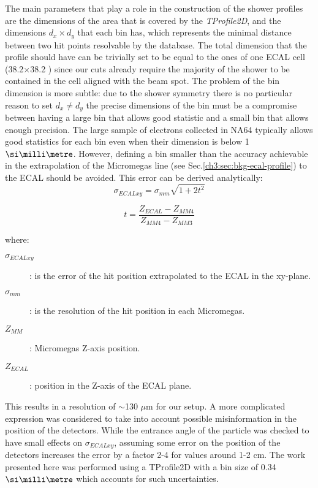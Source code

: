The main parameters that play a role in the construction of the shower
profiles are the dimensions of the area that is covered by the
\textit{TProfile2D}, and the dimensions $d_x \times d_y$ that each bin has,
which represents the minimal distance between two hit points resolvable by the database.  The total dimension that the profile
should have can be trivially set to be equal to the ones of one ECAL
cell (38.2$\times$38.2 \mms) since our cuts already require the majority of the shower to be contained in the cell aligned with the beam spot. The problem of the bin dimension is
more subtle: due to the shower symmetry there is no particular reason
to set $d_x \neq d_y$ the precise dimensions of the bin must be a
compromise between having a large bin that allows good statistic and a
small bin that allows enough precision. The large sample of electrons
collected in NA64 typically allows good statistics for each bin even
when their dimension is below 1 $\mmi$. However, defining a bin smaller
than the accuracy achievable in the extrapolation of the Micromegas line (see Sec.\ref{ch3:sec:bkg-ecal-profile}) to the ECAL should be avoided. This error can be
derived analytically:
\begin{equation}
  \sigma_{ECALxy} = \sigma_{mm}\sqrt{1+2t^2}
  \label{eqn:MMerror}
\end{equation}

\begin{equation}
  t = \frac{Z_{ECAL}-Z_{MM4}}{Z_{MM4}-Z_{MM3}}
  \label{eqn:T}
\end{equation}

where:
\begin{description}
\item[$\sigma_{ECALxy}$]: is the error of the hit position extrapolated to the ECAL in the xy-plane.
\item[$\sigma_{mm}$]: is the resolution of the hit position in each
  Micromegas.
\item[$Z_{MM}$]: Micromegas Z-axis position.
\item[$Z_{ECAL}$]: position in the Z-axis of the ECAL plane.
\end{description}

This results in a resolution of $\sim$130 $\mu$m for our setup. A more
complicated expression was considered to take into account possible
misinformation in the position of the detectors. While the 
entrance angle of the particle was checked to have small effects on
$\sigma_{ECALxy}$, assuming some error on the position of the
detectors increases the error by a factor 2-4 for values around 1-2
\si{\centi\meter}. The work presented here was performed using a TProfile2D
with a bin size of 0.34 $\mmi$ which accounts for such uncertainties.

